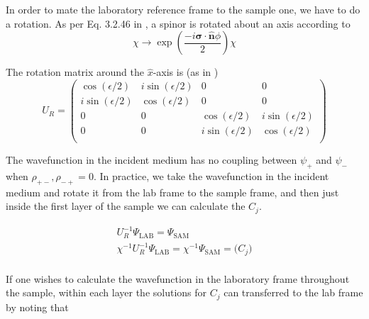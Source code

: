 \documentclass[%
 reprint,
 amsmath,
 amssymb,
 aps,
 prl,
 lengthcheck,%
]{revtex4-1}
\begin{document}
In order to mate the laboratory reference frame to the sample one, we have to do
a rotation.  As per Eq. 3.2.46 in \cite{SakuraiQuantum1994}, a spinor is rotated about
an axis according to
\begin{equation}
  \chi \rightarrow \exp\left(\frac{-i\boldsymbol{\sigma} \cdot \hat{\mathbf{n}} \phi}{2}\right) \chi
\end{equation} 

The rotation matrix around the $\hat x$-axis is (as in \cite{PNRMajkrzakChapter})
\begin{equation}
  U_R = 
  \begin{pmatrix}
    \cos(\epsilon/2) & i \sin(\epsilon/2) & 0 & 0 \\
    i \sin(\epsilon/2) & \cos(\epsilon/2) & 0 & 0 \\
    0 & 0 & \cos(\epsilon/2) & i \sin(\epsilon/2) \\
    0 & 0 & i \sin(\epsilon/2) & \cos(\epsilon/2) \\
  \end{pmatrix}
\end{equation}

The wavefunction in the incident medium has no coupling between
$\psi_+$ and $\psi_-$ when $\rho_{+-}, \rho_{-+} = 0$.  In practice, we take
the wavefunction in the incident medium and rotate it from the lab frame to
the sample frame, and then just inside the first layer of the sample we can calculate
the $C_j$.

\begin{equation}
  \begin{array}{l}
  U_R^{-1} \Psi_{\textrm{LAB}} = \Psi_{\textrm{SAM}} \\
  \chi^{-1} U_R^{-1} \Psi_{\textrm{LAB}} = \chi^{-1} \Psi_{\textrm{SAM}} = \bigg( C_j \bigg) \\
  \end{array}
\end{equation}

If one wishes to calculate the wavefunction in the laboratory frame throughout 
the sample, within each layer the solutions for $C_j$ can transferred to the lab
frame by noting that 
\end{document}
